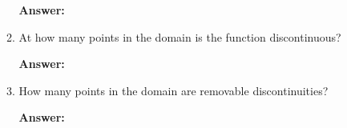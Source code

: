 \documentclass[fleqn,12pt]{article}
\newcommand{\<}{\ensuremath{\langle}}
\renewcommand{\>}{\ensuremath{\rangle}}
\begin{document}
\begin{enumerate}
\begin{enumerate}
        \vskip1cm
        \bigskip

        \hfill {\bf Answer:} \underline{\phantom{XXXXXXXXXXXXXXXXXXXXXXXXXXXXX}}

        \vskip1cm

      \item At how many points in the domain is the function discontinuous?

        \bigskip

        \hfill {\bf Answer:} \underline{\phantom{XXXXXXX}}

        \bigskip

      \item How many points in the domain are removable discontinuities?


        \bigskip

        \hfill {\bf Answer:} \underline{\phantom{XXXXXXX}}


      \end{enumerate}

    \end{enumerate}
\end{document}

